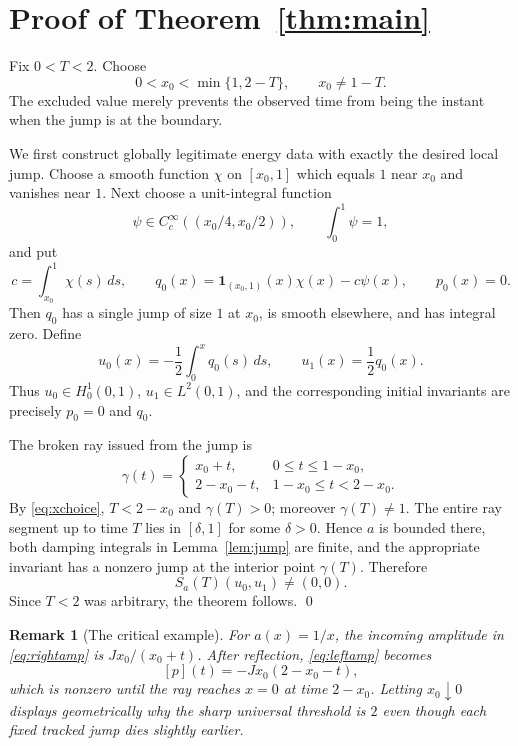 \documentclass[11pt]{article}
\newtheorem{remark}[theorem]{Remark}
\begin{document}
\section{Proof of Theorem~\ref{thm:main}}

Fix $0<T<2$.  Choose
\begin{equation}\label{eq:xchoice}
 0<x_0<\min\{1,2-T\},\qquad x_0\neq1-T.
\end{equation}
The excluded value merely prevents the observed time from being the instant
when the jump is at the boundary.

We first construct globally legitimate energy data with exactly the desired
local jump.  Choose a smooth function $\chi$ on $[x_0,1]$ which equals $1$
near $x_0$ and vanishes near $1$.  Next choose a unit-integral function
\[
 \psi\in C_c^\infty((x_0/4,x_0/2)),\qquad \int_0^1\psi=1,
\]
and put
\[
 c=\int_{x_0}^1\chi(s)\,ds,\qquad
 q_0(x)=\mathbf 1_{(x_0,1)}(x)\chi(x)-c\psi(x),\qquad p_0(x)=0.
\]
Then $q_0$ has a single jump of size $1$ at $x_0$, is smooth elsewhere,
and has integral zero.  Define
\begin{equation}\label{eq:data}
 u_0(x)=-\frac12\int_0^xq_0(s)\,ds,
 \qquad u_1(x)=\frac12q_0(x).
\end{equation}
Thus $u_0\in H^1_0(0,1)$, $u_1\in L^2(0,1)$, and the corresponding initial
invariants are precisely $p_0=0$ and $q_0$.

The broken ray issued from the jump is
\begin{equation}\label{eq:ray}
 \gamma(t)=
 \begin{cases}
 x_0+t,&0\leq t\leq1-x_0,\\
 2-x_0-t,&1-x_0\leq t<2-x_0.
 \end{cases}
\end{equation}
By \eqref{eq:xchoice}, $T<2-x_0$ and $\gamma(T)>0$; moreover
$\gamma(T)\neq1$.  The entire ray segment up to time $T$ lies in
$[\delta,1]$ for some $\delta>0$.  Hence $a$ is bounded there, both damping
integrals in Lemma~\ref{lem:jump} are finite, and the appropriate invariant
has a nonzero jump at the interior point $\gamma(T)$.  Therefore
\[
 S_a(T)(u_0,u_1)\neq(0,0).
\]
Since $T<2$ was arbitrary, the theorem follows.  \qed

\begin{remark}[The critical example]
For $a(x)=1/x$, the incoming amplitude in \eqref{eq:rightamp} is
$Jx_0/(x_0+t)$.  After reflection, \eqref{eq:leftamp} becomes
\[
 [p](t)=-Jx_0(2-x_0-t),
 \]
which is nonzero until the ray reaches $x=0$ at time $2-x_0$.  Letting
$x_0\downarrow0$ displays geometrically why the sharp universal threshold is
$2$ even though each fixed tracked jump dies slightly earlier.
\end{remark}
\end{document}
